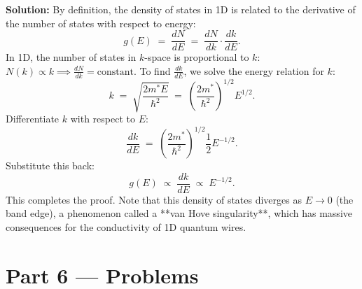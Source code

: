\documentclass[12pt, a4paper]{book}
\begin{document}
\begin{problembox}
\begin{enumerate}[label=\textbf{E\arabic*.}]
        \textbf{Solution:}
        By definition, the density of states in 1D is related to the derivative of the number of states with respect to energy:
        \[
          g(E) \;=\; \frac{dN}{dE} \;=\; \frac{dN}{dk} \cdot \frac{dk}{dE}.
        \]
        In 1D, the number of states in $k$-space is proportional to $k$: $N(k) \propto k \implies \frac{dN}{dk} = \text{constant}$.
        To find $\frac{dk}{dE}$, we solve the energy relation for $k$:
        \[
          k \;=\; \sqrt{\frac{2m^* E}{\hbar^2}} \;=\; \left(\frac{2m^*}{\hbar^2}\right)^{1/2} E^{1/2}.
        \]
        Differentiate $k$ with respect to $E$:
        \[
          \frac{dk}{dE} \;=\; \left(\frac{2m^*}{\hbar^2}\right)^{1/2} \frac{1}{2} E^{-1/2}.
        \]
        Substitute this back:
        \[
          g(E) \;\propto\; \frac{dk}{dE} \;\propto\; E^{-1/2}.
        \]
        This completes the proof. Note that this density of states diverges as $E \to 0$ (the band edge), a phenomenon called a **van Hove singularity**, which has massive consequences for the conductivity of 1D quantum wires.
\end{enumerate}
\end{problembox}

\newpage

\section{Part 6 --- Problems}
\end{document}
